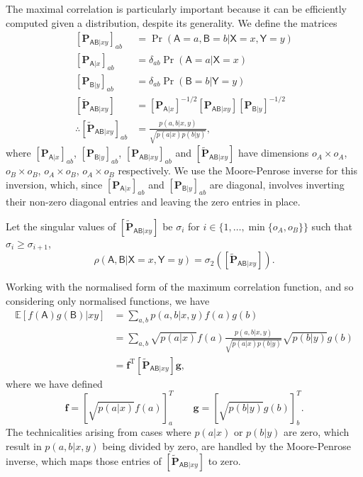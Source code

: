 \documentclass[10pt, a4paper]{article}
\numberwithin{equation}{section} %
\theoremstyle{definition}
\theoremstyle{plain}
\newcommand{\dintv}[2]{\mathopen\{#1,\ldots,#2\mathclose\}}
\newcommand{\?}{\mathrel{?}} %
\newcommand{\cvec}[1]{\boldsymbol{\mathbf{#1}}}    %
\newcommand{\rvec}[1]{\boldsymbol{\mathbf{#1}}^{\mathrm{T}}} %
\newcommand{\matrp}[2]{\left[\mathbf{#1}#2\right]} %
\newcommand{\E}{\mathbb{E}} %
\newcommand{\crv}[1]{\mathsf{#1}}
\begin{document}
    The maximal correlation is particularly important because it can be efficiently computed given a distribution, despite its generality. We define the matrices
    \begin{align}
      \matrp{P}{_{\crv{AB}|xy}}_{ab} &= \Pr(\crv{A} = a, \crv{B} = b|\crv{X} = x, \crv{Y} = y) \\
      \matrp{P}{_{\crv{A}|x}}_{ab} &= \delta_{ab} \Pr(\crv{A} = a|\crv{X} = x) \\
      \matrp{P}{_{\crv{B}|y}}_{ab} &= \delta_{ab} \Pr(\crv{B} = b|\crv{Y} = y) \\
      \matrp{\tilde{P}}{_{\crv{AB}|xy}} &= \matrp{P}{_{\crv{A}|x}}^{-1/2} \matrp{P}{_{\crv{AB}|xy}} \matrp{P}{_{\crv{B}|y}}^{-1/2} \\
      \therefore \matrp{\tilde{P}}{_{\crv{AB}|xy}}_{ab} &= \frac{p(a,b|x,y)}{\sqrt{p(a|x)p(b|y)}},
    \end{align}
    where \(\matrp{P}{_{\crv{A}|x}}_{ab}\), \(\matrp{P}{_{\crv{B}|y}}_{ab}\), \(\matrp{P}{_{\crv{AB}|xy}}_{ab}\) and \(\matrp{\tilde{P}}{_{\crv{AB}|xy}}\) have dimensions \(o_A \times o_A\), \(o_B \times o_B\), \(o_A \times o_B\), \(o_A \times o_B\) respectively. We use the Moore-Penrose inverse for this inversion, which, since \(\matrp{P}{_{\crv{A}|x}}_{ab}\) and \(\matrp{P}{_{\crv{B}|y}}_{ab}\) are diagonal, involves inverting their non-zero diagonal entries and leaving the zero entries in place.

    Let the singular values of \(\matrp{\tilde{P}}{_{\crv{AB}|xy}}\) be \(\sigma_i\) for \(i \in \dintv{1}{\min\{o_A, o_B\}}\) such that \(\sigma_{i} \geq \sigma_{i+1}\),
    \begin{equation}
      \rho(\crv{A},\crv{B}|\crv{X}=x,\crv{Y}=y) = \sigma_2\left( \matrp{\tilde{P}}{_{\crv{AB}|xy}} \right).
    \end{equation}

    Working with the normalised form of the maximum correlation function, and so considering only normalised functions, we have
    \begin{align}
      \E[f(\crv{A})g(\crv{B})|xy] &= \sum_{a,b} p(a,b|x,y) f(a)g(b) \\
                      &= \sum_{a,b} \sqrt{p(a|x)} f(a) \frac{p(a,b|x,y)}{\sqrt{p(a|x)p(b|y)}} \sqrt{p(b|y)} g(b) \\
                      &= \rvec{f} \matrp{\tilde{P}}{_{\crv{AB}|xy}} \cvec{g},
    \end{align}
    where we have defined
    \begin{equation}
      \cvec{f} = {[\sqrt{p(a|x)} f(a)]}^T_a \qquad \cvec{g} = {[\sqrt{p(b|y)} g(b)]}^T_b.
    \end{equation}
    The technicalities arising from cases where \(p(a|x)\) or \(p(b|y)\) are zero, which result in \(p(a,b|x,y)\) being divided by zero, are handled by the Moore-Penrose inverse, which maps those entries of \(\matrp{\tilde{P}}{_{\crv{AB}|xy}}\) to zero.
\end{document}
